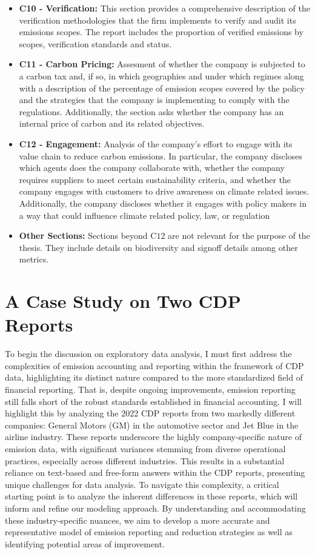 \begin{itemize}
    \item \textbf{C10 - Verification:} This section provides a comprehensive description of the verification methodologies that the firm implements to verify and audit its emissions scopes. The report includes the proportion of verified emissions by scopes, verification standards and status.
    \item \textbf{C11 - Carbon Pricing:} Assesment of whether the company is subjected to a carbon tax and, if so, in which geographies and under which regimes along with a description of the percentage of emission scopes covered by the policy and the strategies that the company is implementing to comply with the regulations. Additionally, the section asks whether the company has an internal price of carbon and its related objectives.
    \item \textbf{C12 - Engagement:} Analysis of the company's effort to engage with its value chain to reduce carbon emissions. In particular, the company discloses which agents does the company collaborate with, whether the company requires suppliers to meet certain sustainability criteria, and whether the company engages with customers to drive awareness on climate related issues. Additionally, the company discloses whether it engages with policy makers in a way that could influence climate related policy, law, or regulation
    \item \textbf{Other Sections:} Sections beyond C$12$ are not relevant for the purpose of the thesis. They include details on biodiversity and signoff details among other metrics.
\end{itemize}

\section{A Case Study on Two CDP Reports}

\noindent To begin the discussion on exploratory data analysis, I must first address the complexities of emission accounting and reporting within the framework of CDP data, highlighting its distinct nature compared to the more standardized field of financial reporting. That is, despite ongoing improvements, emission reporting still falls short of the robust standards established in financial accounting. I will highlight this by analyzing the 2022 CDP reports from two markedly different companies: General Motors (GM) in the automotive sector and Jet Blue in the airline industry. These reports underscore the highly company-specific nature of emission data, with significant variances stemming from diverse operational practices, especially across different industries. This results in a substantial reliance on text-based and free-form answers within the CDP reports, presenting unique challenges for data analysis. To navigate this complexity, a critical starting point is to analyze the inherent differences in these reports, which will inform and refine our modeling approach. By understanding and accommodating these industry-specific nuances, we aim to develop a more accurate and representative model of emission reporting and reduction strategies as well as identifying potential areas of improvement. 

